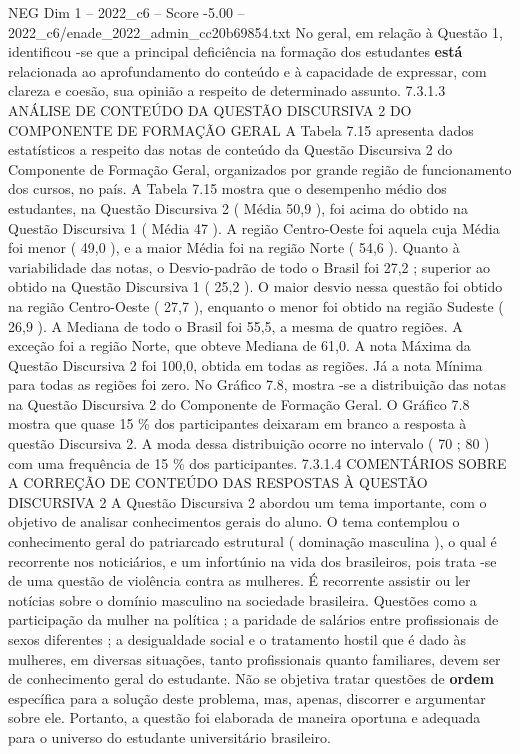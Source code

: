 \begin{textsample}{NEG Dim 1 – 2022\_c6 – Score -5.00 – 2022\_c6/enade\_2022\_admin\_cc20b69854.txt}
No geral, em relação à Questão 1, identificou -se que a principal deficiência na formação dos estudantes \textbf{está} relacionada ao aprofundamento do conteúdo e à capacidade de expressar, com clareza e coesão, sua opinião a respeito de determinado assunto. 7.3.1.3 ANÁLISE DE CONTEÚDO DA QUESTÃO DISCURSIVA 2 DO COMPONENTE DE FORMAÇÃO GERAL A Tabela 7.15 apresenta dados estatísticos a respeito das notas de conteúdo da Questão Discursiva 2 do Componente de Formação Geral, organizados por grande região de funcionamento dos cursos, no país.
A Tabela 7.15 mostra que o desempenho médio dos estudantes, na Questão Discursiva 2 ( Média 50,9 ), foi acima do obtido na Questão Discursiva 1 ( Média 47 ).
A região Centro-Oeste foi aquela cuja Média foi menor ( 49,0 ), e a maior Média foi na região Norte ( 54,6 ).
Quanto à variabilidade das notas, o Desvio-padrão de todo o Brasil foi 27,2 ; superior ao obtido na Questão Discursiva 1 ( 25,2 ).
O maior desvio nessa questão foi obtido na região Centro-Oeste ( 27,7 ), enquanto o menor foi obtido na região Sudeste ( 26,9 ).
A Mediana de todo o Brasil foi 55,5, a mesma de quatro regiões.
A exceção foi a região Norte, que obteve Mediana de 61,0.
A nota Máxima da Questão Discursiva 2 foi 100,0, obtida em todas as regiões.
Já a nota Mínima para todas as regiões foi zero.
No Gráfico 7.8, mostra -se a distribuição das notas na Questão Discursiva 2 do Componente de Formação Geral.
O Gráfico 7.8 mostra que quase 15 \% dos participantes deixaram em branco a resposta à questão Discursiva 2.
A moda dessa distribuição ocorre no intervalo ( 70 ; 80 ) com uma frequência de 15 \% dos participantes. 7.3.1.4 COMENTÁRIOS SOBRE A CORREÇÃO DE CONTEÚDO DAS RESPOSTAS À QUESTÃO DISCURSIVA 2 A Questão Discursiva 2 abordou um tema importante, com o objetivo de analisar conhecimentos gerais do aluno.
O tema contemplou o conhecimento geral do patriarcado estrutural ( dominação masculina ), o qual é recorrente nos noticiários, e um infortúnio na vida dos brasileiros, pois trata -se de uma questão de violência contra as mulheres.
É recorrente assistir ou ler notícias sobre o domínio masculino na sociedade brasileira.
Questões como a participação da mulher na política ; a paridade de salários entre profissionais de sexos diferentes ; a desigualdade social e o tratamento hostil que é dado às mulheres, em diversas situações, tanto profissionais quanto familiares, devem ser de conhecimento geral do estudante.
Não se objetiva tratar questões de \textbf{ordem} específica para a solução deste problema, mas, apenas, discorrer e argumentar sobre ele.
Portanto, a questão foi elaborada de maneira oportuna e adequada para o universo do estudante universitário brasileiro.

\end{textsample}
